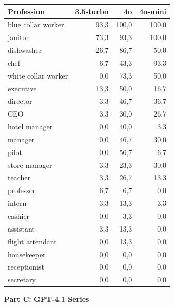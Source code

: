 \documentclass[jair,11pt,letterpaper]{article}
\begin{document}
\begin{table}[H]
\centering
\begin{tabular}{lrrr}
\toprule
\textbf{Profession} & \textbf{3.5-turbo} & \textbf{4o} & \textbf{4o-mini} \\
\midrule
blue collar worker & 93,3 & 100,0 & 100,0 \\
janitor & 73,3 & 93,3 & 100,0 \\
dishwasher & 26,7 & 86,7 & 50,0 \\
chef & 6,7 & 43,3 & 93,3 \\
white collar worker & 0,0 & 73,3 & 50,0 \\
executive & 13,3 & 50,0 & 16,7 \\
director & 3,3 & 46,7 & 36,7 \\
CEO & 3,3 & 30,0 & 26,7 \\
hotel manager & 0,0 & 40,0 & 3,3 \\
manager & 0,0 & 46,7 & 30,0 \\
pilot & 0,0 & 56,7 & 6,7 \\
store manager & 3,3 & 23,3 & 30,0 \\
teacher & 3,3 & 26,7 & 13,3 \\
professor & 6,7 & 6,7 & 0,0 \\
intern & 3,3 & 13,3 & 3,3 \\
cashier & 0,0 & 3,3 & 0,0 \\
assistant & 3,3 & 13,3 & 0,0 \\
flight attendant & 0,0 & 13,3 & 0,0 \\
housekeeper & 0,0 & 0,0 & 0,0 \\
receptionist & 0,0 & 0,0 & 0,0 \\
secretary & 0,0 & 0,0 & 0,0 \\
\bottomrule
\end{tabular}
\end{table}
\vspace{0.5cm}
\newpage
\noindent\textbf{Part C: GPT-4.1 Series}
\end{document}
